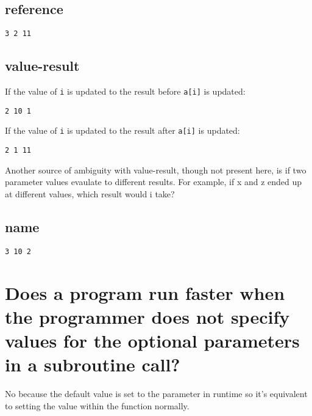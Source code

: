 \documentclass[letterpaper]{article}
\begin{document}
\subsection{reference}
\begin{adjustwidth}{2.35em}{0pt}
\begin{Verbatim}
3 2 11
\end{Verbatim}
\end{adjustwidth}
\subsection{value-result}
\begin{adjustwidth}{2.35em}{0pt}
If the value of \texttt{i} is updated to the result before \texttt{a[i]} is updated:
\begin{Verbatim}
2 10 1
\end{Verbatim}
If the value of \texttt{i} is updated to the result after \texttt{a[i]} is updated:
\begin{Verbatim}
2 1 11
\end{Verbatim}
Another source of ambiguity with value-result, though not present here, is if two parameter values evaulate to different results. For example, if x and z ended up at different values, which result would i take?
\end{adjustwidth}
\subsection{name}
\begin{adjustwidth}{2.35em}{0pt}
\begin{Verbatim}
3 10 2
\end{Verbatim}
\end{adjustwidth}

\section{Does a program run faster when the programmer does not specify values for the optional parameters in a subroutine call?}
\begin{adjustwidth}{2.35em}{0pt}
No because the default value is set to the parameter in runtime so it's equivalent to setting the value within the function normally.
\end{adjustwidth}
\end{document}
